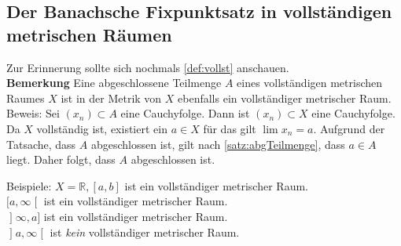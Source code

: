 \documentclass[ngerman,titlepage,twoside, parskip=half*]{scrreprt}
\newcommand*{\R}{\mathbb{R}}
\theoremstyle{break}
\theoremstyle{nonumberbreak}
\newcommand*{\lsofint}[1]{\mathopen{]}#1]}   %
\newcommand*{\rsofint}[1]{[#1\mathclose{[}}  %
\newcommand*{\bsofint}[1]{\mathopen{]}#1\mathclose{[}} %
\begin{document}
\subsection{Der Banachsche Fixpunktsatz in vollständigen metrischen Räumen}

Zur Erinnerung sollte sich nochmals \autoref{def:vollst} anschauen.\\
\textbf{Bemerkung} Eine abgeschlossene Teilmenge $A$ eines vollständigen metrischen Raumes $X$ ist in der Metrik
von $X$ ebenfalls ein vollständiger metrischer Raum.\\
Beweis: Sei $(x_n)\subset A$ eine Cauchyfolge. Dann ist $(x_n)\subset X$ eine Cauchyfolge. Da $X$ vollständig ist,
existiert ein $a\in X$ für das gilt $\lim x_n=a$. Aufgrund der Tatsache, dass $A$ abgeschlossen ist, gilt nach
\autoref{satz:abgTeilmenge}, dass $a\in A$ liegt. Daher folgt, dass $A$ abgeschlossen ist.

Beispiele: $X=\R, [a,b]$ ist ein vollständiger metrischer Raum.\\
$\rsofint{a,\infty}$ ist ein vollständiger metrischer Raum.\\
$\lsofint{\infty,a}$ ist ein vollständiger metrischer Raum.\\
$\bsofint{a,\infty}$ ist \emph{kein} vollständiger metrischer Raum.
\end{document}
